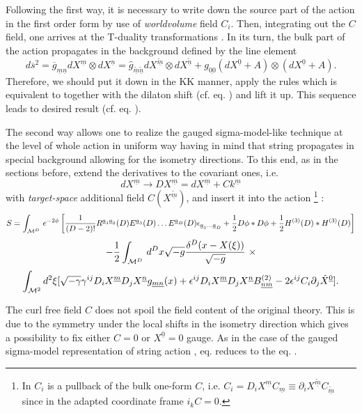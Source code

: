 \documentclass[a4paper,11pt]{article}
\begin{document}
Following the first way, it is necessary to write down the source part of the
action  in the first order form by use of {\it worldvolume} field
$C_i$. Then, integrating out the $C$ field, one arrives at the T-duality
transformations . In its turn, the bulk part of the action propagates
in the background defined by the line element
$$
d{\overline s}^2={\overline g}_{\underline{m}\underline{n}}dX^{\underline m}
\otimes dX^{\underline n}=
\hat{g}_{\underline{\tilde m}\underline{\tilde n}}
dX^{\underline{\tilde m}}\otimes dX^{\underline{\tilde n}}+g_{\underline{00}}
(dX^{\underline{0}}+A)\otimes (dX^{\underline{0}}+A).
$$ 
Therefore, we should
put it down in the KK manner, apply the rules  which is equivalent
to  together with the dilaton shift (cf. eq. ) and lift it up.
This sequence leads to desired result (cf. eq. ).

The second way allows one to realize the gauged sigma-model-like technique at
the level of whole action  in uniform way having in mind that string
propagates in special background allowing for the isometry directions. To this
end, as in the sections before, extend the derivatives
to the covariant ones, i.e.
$$
dX^{\underline m} \longrightarrow
DX^{\underline m}=dX^{\underline m}+C k^{\underline m}
$$
with {\it target-space} additional field $C(X^{\underline{\tilde m}})$, 
and insert it into the action
\footnote{In  $C_i$ is a pullback of the bulk one-form $C$, i.e.
$C_i=D_i X^{\underline m}C_{\underline m}\equiv \partial_i X^
{\underline{\tilde m}}C_{\underline{\tilde m}}$ since in the adapted 
coordinate frame $i_k C=0$.}
:
$$
S=\int_{{\cal M}^D}\, e^{-2\phi}\left[ {1\over (D-2)!}R^{{\underline
a}_1{\underline a}_2}(D)E^{{\underline a}_3}(D)\dots E^{{\underline
a}_D}(D)\epsilon_{{\underline a}_1\dots {\underline a}_D}
+{1\over 2}D\phi \ast D\phi
+{1\over 2}H^{(3)}(D)\ast H^{(3)}(D) \right]
$$
$$
-{1\over 2}\int_{{\cal M}^D}\,d^D x \sqrt{-g}{\delta^D (x-X(\xi))\over
\sqrt{-g}}~\times
$$
\begin{equation}\plabel{Seff1}
\int_{{\cal M}^2} d^2 \xi [
\sqrt{-\g}\g^{ij}D_i X^{\underline m}
D_j X^{\underline n}g_{\underline{mn}}(x)
+\e^{ij}D_i X^{\underline m}D_j X^{\underline n}
B^{(2)}_{\underline{n}\underline{m}}-2\e^{ij}C_i
\partial_j {\hat X}^{\underline 0}].
\end{equation}

The curl free field $C$ does not spoil the field content of the 
original theory. This is due to the symmetry under the local shifts in the
isometry direction which gives a possibility to fix either $C=0$ or
$X^{\underline 0}=0$ gauge. As in the case of the gauged sigma-model 
representation of string action , eq.  reduces to the eq. 
.
\end{document}
